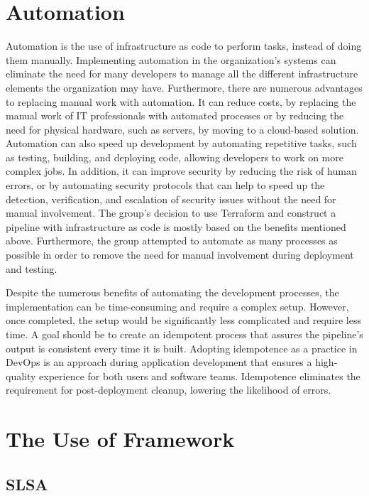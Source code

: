 \section{Automation}
Automation is the use of \gls{infrastructure as code} to perform tasks, instead of doing them manually. Implementing automation in the organization's systems can eliminate the need for many developers to manage all the different infrastructure elements the organization may have. Furthermore, there are numerous advantages to replacing manual work with automation. It can reduce costs, by replacing the manual work of IT professionals with automated processes or by reducing the need for physical hardware, such as servers, by moving to a cloud-based solution. Automation can also speed up development by automating repetitive tasks, such as testing, building, and deploying code, allowing developers to work on more complex jobs. In addition, it can improve security by reducing the risk of human errors, or by automating security protocols that can help to speed up the detection, verification, and escalation of security issues without the need for manual involvement. The group's decision to use Terraform and construct a pipeline with \gls{infrastructure as code} is mostly based on the benefits mentioned above. Furthermore, the group attempted to automate as many processes as possible in order to remove the need for manual involvement during deployment and testing. \cite{automation} \cite{automationredhat}

Despite the numerous benefits of automating the development processes, the implementation can be time-consuming and require a complex setup. However, once completed, the setup would be significantly less complicated and require less time. A goal should be to create an idempotent process that assures the pipeline's output is consistent every time it is built. Adopting idempotence as a practice in DevOps is an approach during application development that ensures a high-quality experience for both users and software teams. Idempotence eliminates the requirement for post-deployment cleanup, lowering the likelihood of errors. \cite{idempotent}

\section{The Use of Framework}
\subsection{SLSA}
